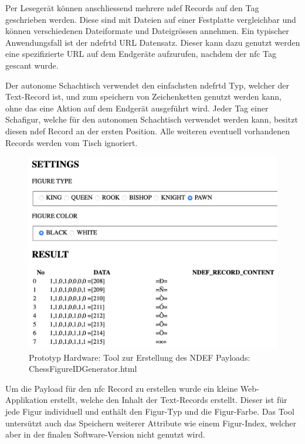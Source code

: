Per Lesegerät können anschliessend mehrere \gls{ndef} Records auf den
Tag geschrieben werden. Diese sind mit Dateien auf einer Festplatte
vergleichbar und können verschiedenen Dateiformate und Dateigrössen
annehmen. Ein typischer Anwendungsfall ist der \gls{ndefrtd} URL
Datensatz. Dieser kann dazu genutzt werden eine spezifizierte URL auf
dem Endgeräte aufzurufen, nachdem der \gls{nfc} Tag gescant
wurde.\cite{nordicnfclibndef}

Der autonome Schachtisch verwendet den einfachsten \gls{ndefrtd} Typ,
welcher der Text-Record ist, und zum speichern von Zeichenketten genutzt
werden kann, ohne das eine Aktion auf dem Endgerät ausgeführt wird.
Jeder Tag einer Schafigur, welche für den autonomen Schachtisch
verwendet werden kann, besitzt diesen \gls{ndef} Record an der ersten
Position. Alle weiteren eventuell vorhandenen Records werden vom Tisch
ignoriert.\cite{nordicnfclib}

\begin{figure}
\centering
\includegraphics{images/ATC_ChessFigureIDGenerator.png}
\caption{Prototyp Hardware: Tool zur Erstellung des NDEF Payloads:
ChessFigureIDGenerator.html}
\end{figure}

Um die Payload für den \gls{nfc} Record zu erstellen wurde ein kleine
Web-Applikation erstellt, welche den Inhalt der Text-Records erstellt.
Dieser ist für jede Figur individuell und enthält den Figur-Typ und die
Figur-Farbe. Das Tool untersützt auch das Speichern weiterer Attribute
wie einem Figur-Index, welcher aber in der finalen Software-Version
nicht genutzt wird.

